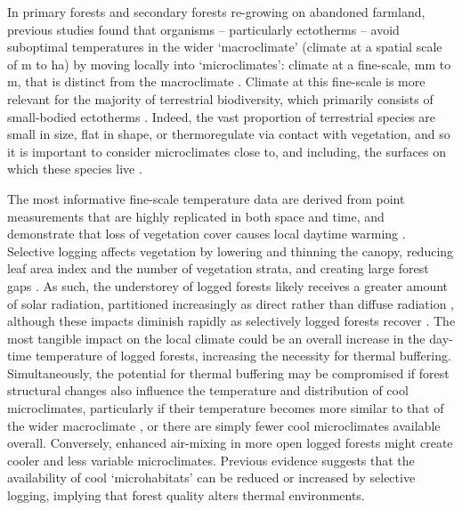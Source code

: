 \documentclass[12pt,a4paper,]{report}
\theoremstyle{definition}
\theoremstyle{definition}
\theoremstyle{definition}
\theoremstyle{remark}
\begin{document}
In primary forests and secondary forests re-growing on abandoned
farmland, previous studies found that organisms -- particularly
ectotherms -- avoid suboptimal temperatures in the wider `macroclimate'
(climate at a spatial scale of m to ha) by moving locally into
`microclimates': climate at a fine-scale, mm to m, that is distinct from
the macroclimate
\citep{scheffers_microhabitats_2014-1, scheffers_microhabitats_2014, gonzalez_del_pliego_thermally_2016}.
Climate at this fine-scale is more relevant for the majority of
terrestrial biodiversity, which primarily consists of small-bodied
ectotherms
\citep{suggitt_habitat_2011, potter_microclimatic_2013, nadeau_coarse_2017}.
Indeed, the vast proportion of terrestrial species are small in size,
flat in shape, or thermoregulate via contact with vegetation, and so it
is important to consider microclimates close to, and including, the
surfaces on which these species live
\citep{kaspari_thermal_2015, scheffers_extreme_2017}.

The most informative fine-scale temperature data are derived from point
measurements that are highly replicated in both space and time, and
demonstrate that loss of vegetation cover causes local daytime warming
\citep{senior_pantropical_2017, ewers_fragmentation_2013, hardwick_relationship_2015, gonzalez_del_pliego_thermally_2016}.
Selective logging affects vegetation by lowering and thinning the
canopy, reducing leaf area index
\citep{hardwick_relationship_2015, ewers_logging_2015} and the number of
vegetation strata, and creating large forest gaps
\citep{okuda_effect_2003, kumar_effects_2005}. As such, the understorey
of logged forests likely receives a greater amount of solar radiation,
partitioned increasingly as direct rather than diffuse radiation
\citep{oke_boundary_1987}, although these impacts diminish rapidly as
selectively logged forests recover \citep{asner_canopy_2004}. The most
tangible impact on the local climate could be an overall increase in the
day-time temperature of logged forests, increasing the necessity for
thermal buffering. Simultaneously, the potential for thermal buffering
may be compromised if forest structural changes also influence the
temperature and distribution of cool microclimates, particularly if
their temperature becomes more similar to that of the wider macroclimate
\citep[e.g.][]{caillon_warming_2014}, or there are simply fewer cool
microclimates available overall. Conversely, enhanced air-mixing in more
open logged forests might create cooler and less variable microclimates.
Previous evidence suggests that the availability of cool `microhabitats'
\citep[localised environments within which cool microclimates are
contained;][]{scheffers_microhabitats_2014-1, gonzalez_del_pliego_thermally_2016, shi_framework_2016}
can be reduced \citep[e.g.~leaf litter;][]{saner_reduced_2009} or
increased \citep[e.g.~deadwood;][]{carlson_deadwood_2017} by selective
logging, implying that forest quality alters thermal environments.
\end{document}

